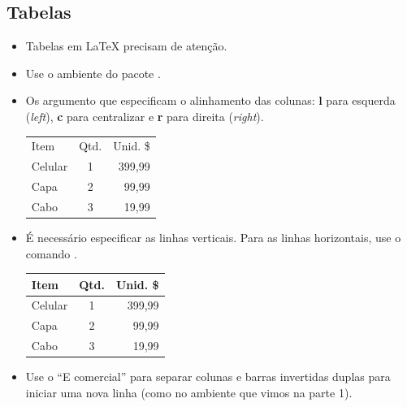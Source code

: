 \documentclass{beamer}
\begin{document}
\subsection{Tabelas}
\begin{frame}[fragile]{\insertsubsection}
\begin{itemize}
\item Tabelas em \LaTeX{} precisam de atenção.
\item Use o ambiente  do pacote .
\item Os argumento que especificam o alinhamento das colunas: \textbf{l} para esquerda (\emph{left}), \textbf{c} para centralizar e \textbf{r} para direita (\emph{right}).
\begin{exampletwouptiny}
\begin{tabular}{lcr}
Item    & Qtd. & Unid. \$ \\
Celular & 1    & 399,99  \\
Capa    & 2    & 99,99  \\
Cabo    & 3    & 19,99   \\
\end{tabular}
\end{exampletwouptiny}
\item É necessário especificar as linhas verticais. Para as linhas horizontais,  use o
comando .
\begin{exampletwouptiny}
\begin{tabular}{|l|c|r|} \hline
Item    & Qtd. & Unid. \$ \\\hline
Celular & 1    & 399,99  \\
Capa    & 2    & 99,99  \\
Cabo    & 3    & 19,99   \\\hline
\end{tabular}
\end{exampletwouptiny}
\item Use o ``E comercial''  \keystrokebftt{\&} para separar colunas e barras
invertidas duplas \keystrokebftt{\bs}\keystrokebftt{\bs} para iniciar uma nova
linha (como no ambiente   que vimos na parte 1).
\end{itemize}
\end{frame}

\end{document}
